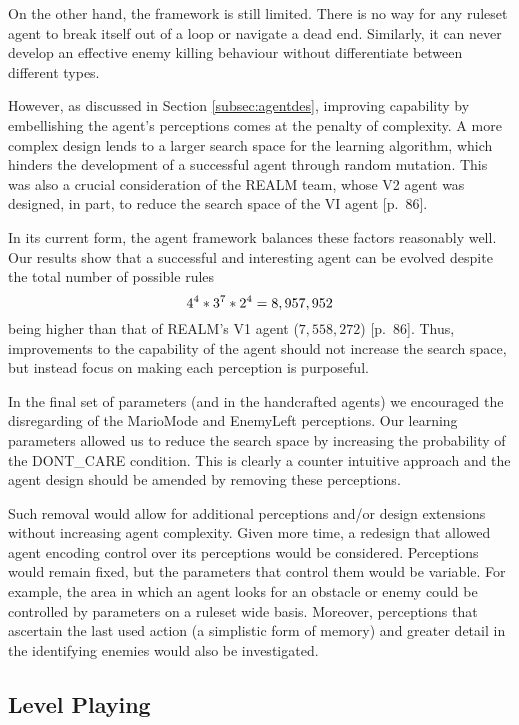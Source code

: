 On the other hand, the framework is still limited. There is no way for any ruleset agent to break itself out of a loop or navigate a dead end. Similarly, it can never develop an effective enemy killing behaviour without differentiate between different types.

However, as discussed in Section \ref{subsec:agentdes}, improving capability by embellishing the agent's perceptions comes at the penalty of complexity. A more complex design lends to a larger search space for the learning algorithm, which hinders the development of a successful agent through random mutation. This was also a crucial consideration of the REALM team, whose V2 agent was designed, in part, to reduce the search space of the VI agent \cite{realm}[p.~86].

In its current form, the agent framework balances these factors reasonably well. Our results show that a successful and interesting agent can be evolved despite the total number of possible rules
\[ \centering
4^4 * 3^7 * 2^4 = 8,957,952
\]
being higher than that of REALM's V1 agent ($7,558,272$) \cite{realm}[p.~86]. Thus, improvements to the capability of the agent should not increase the search space, but instead focus on making each perception is purposeful.

In the final set of parameters (and in the handcrafted agents) we encouraged the disregarding of the MarioMode and EnemyLeft perceptions. Our learning parameters allowed us to reduce the search space by increasing the probability of the {\footnotesize DONT\_CARE} condition. This is clearly a counter intuitive approach and the agent design should be amended by removing these perceptions. 

Such removal would allow for additional perceptions and/or design extensions without increasing agent complexity. Given more time, a redesign that allowed agent encoding control over its perceptions would be considered. Perceptions would remain fixed, but the parameters that control them would be variable. For example, the area in which an agent looks for an obstacle or enemy could be controlled by parameters on a ruleset wide basis. Moreover, perceptions that ascertain the last used action (a simplistic form of memory) and greater detail in the identifying enemies would also be investigated.

\subsection{Level Playing}

